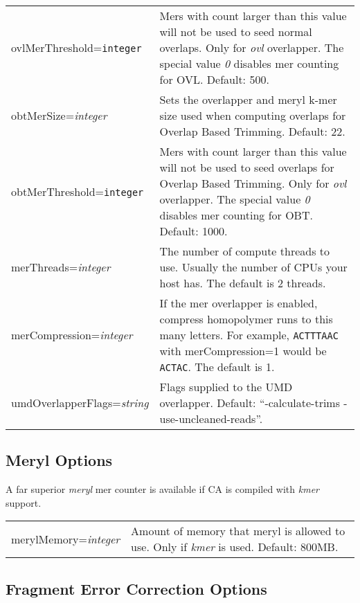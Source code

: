 \documentclass[twoside,11pt]{article}
\begin{document}
\begin{longtable}{lp{3.0in}}
ovlMerThreshold={\tt integer} &
Mers with count larger than this value will not be used to seed
normal overlaps.  Only for {\em ovl} overlapper.  The special value {\it 0}
disables mer counting for OVL.  Default: 500.
\\


obtMerSize={\it integer} &
Sets the overlapper and meryl k-mer size used when computing overlaps
for Overlap Based Trimming.  Default: 22.
\\

obtMerThreshold={\tt integer} &
Mers with count larger than this value will not be used to seed
overlaps for Overlap Based Trimming.  Only for {\em ovl} overlapper.  The special value {\it 0}
disables mer counting for OBT.  Default: 1000.
\\


merThreads={\it integer} &
The number of compute threads to use.  Usually the number of CPUs your
host has.
The default is 2 threads.
\\

merCompression={\it integer} &
If the mer overlapper is enabled, compress homopolymer runs to this many letters.
For example, {\tt ACTTTAAC} with merCompression=1 would be {\tt ACTAC}.
The default is 1.
\\

umdOverlapperFlags={\it string} &
Flags supplied to the UMD overlapper.  Default: ``-calculate-trims -use-uncleaned-reads''.
\\

\end{longtable}

\subsection{Meryl Options}
\label{sec:merylopts}

A far superior {\em meryl} mer counter is available if CA is compiled
with {\em kmer} support.

\begin{longtable}{lp{3.0in}}
merylMemory={\it integer} &
Amount of memory that meryl is allowed to use.  Only if {\em kmer} is
used.  Default: 800MB.
\\
\end{longtable}



\subsection{Fragment Error Correction Options}
\end{document}
